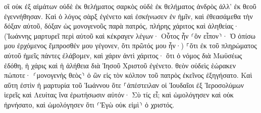 \documentclass{openreader}
\begin{document}
οἳ οὐκ ἐξ αἱμάτων οὐδὲ ἐκ θελήματος σαρκὸς οὐδὲ ἐκ θελήματος ἀνδρὸς ἀλλ’ ἐκ θεοῦ ἐγεννήθησαν. 
Καὶ ὁ λόγος σὰρξ ἐγένετο καὶ ἐσκήνωσεν ἐν ἡμῖν, καὶ ἐθεασάμεθα τὴν δόξαν αὐτοῦ, δόξαν ὡς μονογενοῦς παρὰ πατρός, πλήρης χάριτος καὶ ἀληθείας· 
(Ἰωάννης μαρτυρεῖ περὶ αὐτοῦ καὶ κέκραγεν λέγων· Οὗτος ἦν ⸂ὃν εἶπον⸃· Ὁ ὀπίσω μου ἐρχόμενος ἔμπροσθέν μου γέγονεν, ὅτι πρῶτός μου ἦν·) 
⸀ὅτι ἐκ τοῦ πληρώματος αὐτοῦ ἡμεῖς πάντες ἐλάβομεν, καὶ χάριν ἀντὶ χάριτος· 
ὅτι ὁ νόμος διὰ Μωϋσέως ἐδόθη, ἡ χάρις καὶ ἡ ἀλήθεια διὰ Ἰησοῦ Χριστοῦ ἐγένετο. 
θεὸν οὐδεὶς ἑώρακεν πώποτε· ⸂μονογενὴς θεὸς⸃ ὁ ὢν εἰς τὸν κόλπον τοῦ πατρὸς ἐκεῖνος ἐξηγήσατο. 
Καὶ αὕτη ἐστὶν ἡ μαρτυρία τοῦ Ἰωάννου ὅτε ⸀ἀπέστειλαν οἱ Ἰουδαῖοι ἐξ Ἱεροσολύμων ἱερεῖς καὶ Λευίτας ἵνα ἐρωτήσωσιν αὐτόν· Σὺ τίς εἶ; 
καὶ ὡμολόγησεν καὶ οὐκ ἠρνήσατο, καὶ ὡμολόγησεν ὅτι ⸂Ἐγὼ οὐκ εἰμὶ⸃ ὁ χριστός. 
\end{document}
